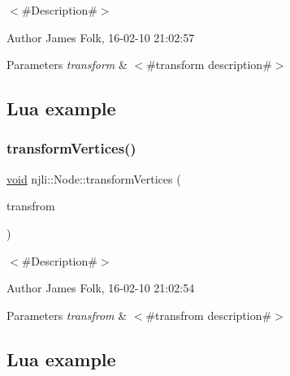 $<$\#\+Description\#$>$ 

\begin{DoxyAuthor}{Author}
James Folk, 16-\/02-\/10 21\+:02\+:57
\end{DoxyAuthor}

\begin{DoxyParams}{Parameters}
{\em transform} & $<$\#transform description\#$>$\\
\hline
\end{DoxyParams}
\hypertarget{classnjli_1_1_steering_behavior_wander_ex1}{}\subsection{Lua example}\label{classnjli_1_1_steering_behavior_wander_ex1}

\begin{DoxyCodeInclude}
\end{DoxyCodeInclude}
\mbox{\label{classnjli_1_1_node_aa46eb060cb1055d933b0b0908b8c416d}} 
\subsubsection{\texorpdfstring{transform\+Vertices()}{transformVertices()}}
{\footnotesize\ttfamily \mbox{\hyperlink{_thread_8h_af1e856da2e658414cb2456cb6f7ebc66}{void}} njli\+::\+Node\+::transform\+Vertices (\begin{DoxyParamCaption}\item[{const bt\+Transform \&}]{transfrom }\end{DoxyParamCaption})}



$<$\#\+Description\#$>$ 

\begin{DoxyAuthor}{Author}
James Folk, 16-\/02-\/10 21\+:02\+:54
\end{DoxyAuthor}

\begin{DoxyParams}{Parameters}
{\em transfrom} & $<$\#transfrom description\#$>$\\
\hline
\end{DoxyParams}
\hypertarget{classnjli_1_1_steering_behavior_wander_ex1}{}\subsection{Lua example}\label{classnjli_1_1_steering_behavior_wander_ex1}

